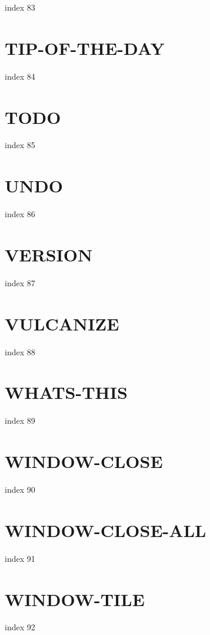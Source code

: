\documentclass[10pt]{report}
\begin{document}
index 83

\section{TIP-OF-THE-DAY}

index 84

\section{TODO}

 index 85

\section{UNDO}

 index 86

\section{VERSION}

index 87

\section{VULCANIZE}

index 88

\section{WHATS-THIS}

index 89

\section{WINDOW-CLOSE}

index 90

\section{WINDOW-CLOSE-ALL}

index 91

\section{WINDOW-TILE}

index 92
\end{document}
